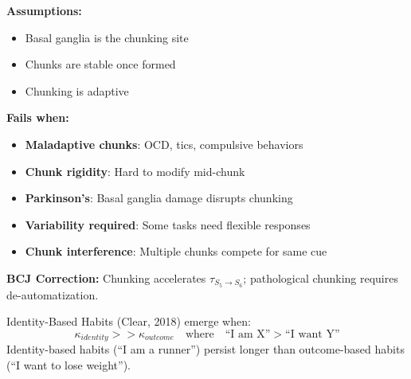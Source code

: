 \begin{tcolorbox}[colback=red!5!white, colframe=red!75!black, title=Boundary Condition: Where Chunking Model Fails]
\textbf{Assumptions:}
\begin{itemize}[nosep]
\item Basal ganglia is the chunking site
\item Chunks are stable once formed
\item Chunking is adaptive
\end{itemize}

\textbf{Fails when:}
\begin{itemize}[nosep]
\item \textbf{Maladaptive chunks}: OCD, tics, compulsive behaviors
\item \textbf{Chunk rigidity}: Hard to modify mid-chunk
\item \textbf{Parkinson's}: Basal ganglia damage disrupts chunking
\item \textbf{Variability required}: Some tasks need flexible responses
\item \textbf{Chunk interference}: Multiple chunks compete for same cue
\end{itemize}

\textbf{BCJ Correction:} Chunking accelerates $\tau_{S_5 \to S_6}$; pathological chunking requires de-automatization.
\end{tcolorbox}


\begin{theorem}
\label{thm:habit-identity}
Identity-Based Habits (Clear, 2018) emerge when:
\begin{equation}
\boxed{\kappa_{identity} >> \kappa_{outcome} \quad \text{where} \quad \text{``I am X''} > \text{``I want Y''}}
\end{equation}
Identity-based habits (``I am a runner'') persist longer than outcome-based habits (``I want to lose weight'').
\end{theorem}

